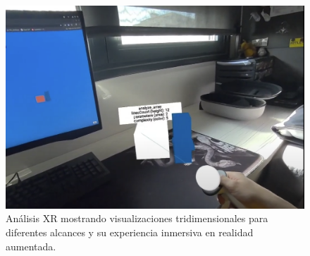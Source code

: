 \documentclass[a4paper, 12pt]{book}
\begin{document}
\begin{figure}[H]
\begin{minipage}[b]{0.32\textwidth}
\end{minipage}
\hfill
\begin{minipage}[b]{0.32\textwidth}
\centering
\includegraphics[width=\textwidth]{img/xr-experiencia-ar.png}
\end{minipage}
\caption{Análisis XR mostrando visualizaciones tridimensionales para diferentes alcances y su experiencia inmersiva en realidad aumentada.}
\label{fig:xr-analisis}
\end{figure}
\end{document}
